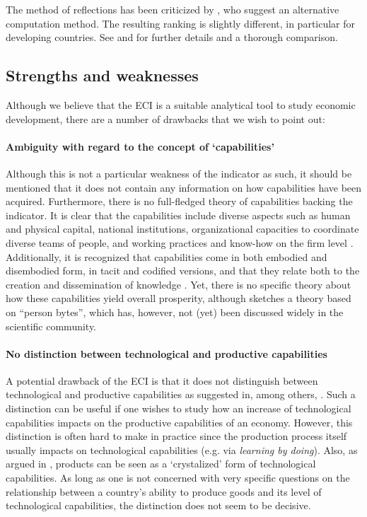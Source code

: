 \documentclass[11pt,a4paper]{article}
\begin{document}
The method of reflections has been criticized by \citet{Cristelli:2013hj}, who suggest an alternative computation method. 
The resulting ranking is slightly different, in particular for developing countries.
See \citet{Tacchella:2012fx} and \citet{Tacchella:2013ko}  for further details and a thorough comparison.

\subsection{Strengths and weaknesses}

Although we believe that the ECI is a suitable analytical tool to study economic development, there are a number of drawbacks that we wish to point out:

\paragraph{Ambiguity with regard to the concept of `capabilities'}
Although this is not a particular weakness of the indicator as such, it should be mentioned that it does not contain any information on how capabilities have been acquired.
Furthermore, there is no full-fledged theory of capabilities backing the indicator.
It is clear that the capabilities include diverse aspects such as human and physical capital, national institutions, organizational capacities to coordinate diverse teams of people, and working practices and know-how on the firm level  \citep[e.g.][p. 37]{Felipe:2012fv}.
Additionally, it is recognized that capabilities come in both embodied and disembodied form, in tacit and codified versions, and that they relate both to the creation and dissemination of knowledge \citep[e.g.][p. 177-178]{Archibugi:2005iu}.
Yet, there is no specific theory about how these capabilities yield overall prosperity, although \citet{Hidalgo:2015vs} sketches a theory based on ``person bytes'', which has, however, not (yet) been discussed widely in the scientific community.

\paragraph{No distinction between technological and productive capabilities}
A potential drawback of the ECI is that it does not distinguish between technological and productive capabilities as suggested in, among others, \citet[p. 919]{Archibugi:2009bf}. 
Such a distinction can be useful if one wishes to study how an increase of technological capabilities impacts on the productive capabilities of an economy. 
However, this distinction is often hard to make in practice since the production process itself usually impacts on technological capabilities (e.g. via \textit{learning by doing}).
Also, as argued in \citet{Hidalgo:2015vs}, products can be seen as a `crystalized' form of technological capabilities.
As long as one is not concerned with very specific questions on the relationship between a country's ability to produce goods and its level of technological capabilities, the distinction does not seem to be decisive.
\end{document}
